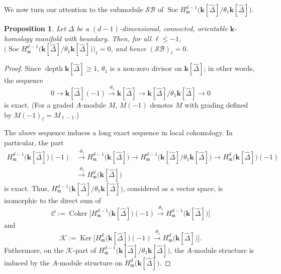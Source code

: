 \documentclass[10pt]{amsart}
\newtheorem{prop}[theorem]{Proposition}
\theoremstyle{definition}
\providecommand{\C}{\mathcal C}
\DeclareMathOperator{\Soc}{Soc}
\DeclareMathOperator\depth{depth}
\DeclareMathOperator\Ker{Ker}
\DeclareMathOperator\Coker{Coker}
\newcommand{\complet}[1]{\hat{#1}}
\newcommand{\SB}{\mathcal{SB}}
\newcommand{\field}{\mathbf{k}}
\renewcommand{\C}{{\mathcal C}}
\newcommand{\K}{{\mathcal K}}
\newcommand{\mideal}{\ensuremath{\mathfrak{m}}}
\begin{document}
We now turn our attention to the submodule $\SB$ of $\Soc H^{d-1}_\mideal\big(\field[\complet{\Delta}]/\theta_1\field[\complet{\Delta}]\big)$.
\begin{prop} \label{SB}
Let $\Delta$ be a $(d-1)$-dimensional, connected, orientable $\field$-homology manifold with boundary. Then, for all $\ell\leq -1$, $\big(\Soc H^{d-1}_\mideal\big(\field[\complet{\Delta}]/\theta_1\field[\complet{\Delta}]\big)\big)_\ell=0$, and hence $(\SB)_\ell=0$.
\end{prop}
\begin{proof}
Since $\depth \field[\complet{\Delta}]\geq 1$, $\theta_1$ is a non-zero divisor on $\field[\complet{\Delta}]$; in other words, the sequence
\[
0\to \field[\complet{\Delta}](-1) \stackrel{\cdot \theta_1}{\longrightarrow} \field[\complet{\Delta}] \longrightarrow \field[\complet{\Delta}]/\theta_1\field[\complet{\Delta}]\to 0
\]
is exact. (For a graded $A$-module $M$, $M(-1)$ denotes $M$ with grading defined by $M(-1)_\ell=M_{\ell-1}$.) 

The above sequence induces a long exact sequence in local cohomology. In particular, the part
\[
\begin{aligned}
H^{d-1}_\mideal\big(\field[\complet{\Delta}]\big)(-1) &\stackrel{\cdot \theta_1}{\longrightarrow} H^{d-1}_\mideal\big(\field[\complet{\Delta}]\big) \longrightarrow H^{d-1}_\mideal\big(\field[\complet{\Delta}]/\theta_1\field[\complet{\Delta}]\big)\longrightarrow H^{d}_\mideal\big(\field[\complet{\Delta}]\big)(-1) 
\\
&\stackrel{\cdot \theta_1}{\longrightarrow} H^{d}_\mideal\big(\field[\complet{\Delta}]\big)
\end{aligned}
\]
is exact. Thus, $H^{d-1}_\mideal\big(\field[\complet{\Delta}]/\theta_1\field[\complet{\Delta}]\big)$, considered as a vector space, is isomorphic to the direct sum of 
\[
\C:=\Coker \big[H^{d-1}_\mideal\big(\field[\complet{\Delta}]\big)(-1) \stackrel{\cdot \theta_1}{\longrightarrow} H^{d-1}_\mideal\big(\field[\complet{\Delta}]\big)\big]\] 
and 
\[\K:=\Ker \big[H^{d}_\mideal\big(\field[\complet{\Delta}]\big)(-1) \stackrel{\cdot \theta_1}{\longrightarrow} H^{d}_\mideal\big(\field[\complet{\Delta}]\big)\big].
\]
 Futhermore, on the $\K$-part of $H^{d-1}_\mideal\big(\field[\complet{\Delta}]/\theta_1\field[\complet{\Delta}]\big)$, the $A$-module structure is induced by the $A$-module structure on $H^{d}_\mideal\big(\field[\complet{\Delta}]\big)$.


\end{proof}
\end{document}
